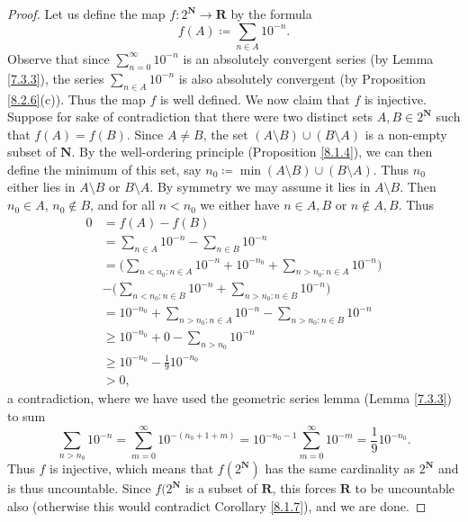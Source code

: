\begin{proof}
    Let us define the map \(f : 2^{\mathbf{N}} \to \mathbf{R}\) by the formula
    \[
        f(A) \coloneqq \sum_{n \in A} 10^{-n}.
    \]
    Observe that since \(\sum_{n = 0}^\infty 10^{-n}\) is an absolutely convergent series (by Lemma \ref{7.3.3}), the series \(\sum_{n \in A} 10^{-n}\) is also absolutely convergent (by Proposition \ref{8.2.6}(c)).
    Thus the map \(f\)  is well defined.
    We now claim that \(f\) is injective.
    Suppose for sake of contradiction that there were two distinct sets \(A, B \in 2^{\mathbf{N}}\) such that \(f(A) = f(B)\).
    Since \(A \neq B\), the set \((A \setminus B) \cup (B \setminus A)\) is a non-empty subset of \(\mathbf{N}\).
    By the well-ordering principle (Proposition \ref{8.1.4}), we can then define the minimum of this set, say \(n_0 \coloneqq \min(A \setminus B) \cup (B \setminus A)\).
    Thus \(n_0\) either lies in \(A \setminus B\) or \(B \setminus A\).
    By symmetry we may assume it lies in \(A \setminus B\).
    Then \(n_0 \in A\), \(n_0 \notin B\), and for all \(n < n_0\) we either have \(n \in A, B\) or \(n \notin A, B\).
    Thus
    \begin{align*}
        0 & = f(A) - f(B)                                                                                 \\
          & = \sum_{n \in A} 10^{-n} - \sum_{n \in B} 10^{-n}                                             \\
          & = \Bigg(\sum_{n < n_0 : n \in A} 10^{-n} + 10^{-n_0} + \sum_{n > n_0 : n \in A} 10^{-n}\Bigg) \\
          & - \Bigg(\sum_{n < n_0 : n \in B} 10^{-n} + \sum_{n > n_0 : n \in B} 10^{-n}\Bigg)             \\
          & = 10^{-n_0} + \sum_{n > n_0 : n \in A} 10^{-n} - \sum_{n > n_0 : n \in B} 10^{-n}             \\
          & \geq 10^{-n_0} + 0 - \sum_{n > n_0} 10^{-n}                                                   \\
          & \geq 10^{-n_0} - \frac{1}{9} 10^{-n_0}                                                        \\
          & > 0,
    \end{align*}
    a contradiction, where we have used the geometric series lemma (Lemma \ref{7.3.3}) to sum
    \[
        \sum_{n > n_0} 10^{-n} = \sum_{m = 0}^\infty 10^{-(n_0 + 1 + m)} = 10^{-n_0 - 1} \sum_{m = 0}^\infty 10^{-m} = \frac{1}{9} 10^{-n_0}.
    \]
    Thus \(f\) is injective, which means that \(f(2^{\mathbf{N}})\) has the same cardinality as \(2^{\mathbf{N}}\) and is thus uncountable.
    Since \(f(2^{\mathbf{N}}\) is a subset of \(\mathbf{R}\), this forces \(\mathbf{R}\) to be uncountable also (otherwise this would contradict Corollary \ref{8.1.7}), and we are done.
\end{proof}

